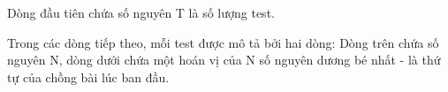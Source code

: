 Dòng đầu tiên chứa số nguyên T là số lượng test.

Trong các dòng tiếp theo, mỗi test được mô tả bởi hai dòng: Dòng trên chứa số nguyên N, dòng dưới chứa một hoán vị của N số nguyên dương bé nhất - là thứ tự của chồng bài lúc ban đầu.